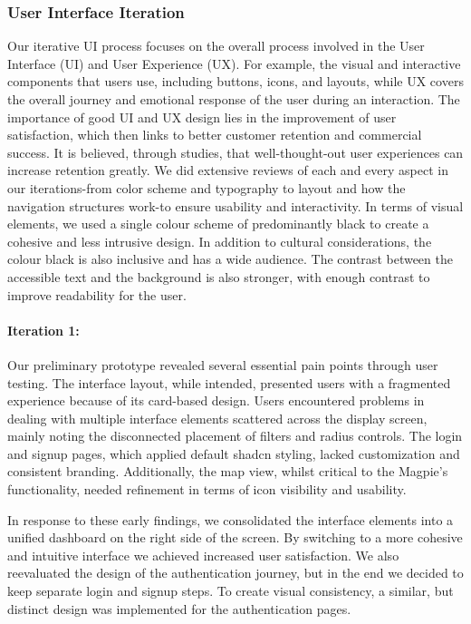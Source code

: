 \subsubsection{User Interface Iteration}
Our iterative UI process focuses on the overall process involved in the User
Interface (UI) and User Experience (UX). For example, the visual and interactive
components that users use, including buttons, icons, and layouts, while UX
covers the overall journey and emotional response of the user during an
interaction. The importance of good UI and UX design lies in the improvement of
user satisfaction, which then links to better customer retention and commercial
success. It is believed, through studies, that well-thought-out user experiences
can increase retention greatly.\cite{psycray2023} We did extensive reviews of
each and every aspect in our iterations-from color scheme and typography to
layout and how the navigation structures work-to ensure usability and
interactivity. In terms of visual elements, we used a single colour scheme of
predominantly black to create a cohesive and less intrusive design. In addition
to cultural considerations, the colour black is also inclusive and has a wide
audience. The contrast between the accessible text and the background is also
stronger, with enough contrast to improve readability for the user.

\paragraph{Iteration 1:}

Our preliminary prototype revealed several essential pain points through
user testing. The interface layout, while intended, presented users
with a fragmented experience because of its card-based design.
Users encountered problems in dealing with multiple interface elements scattered
across the display screen, mainly noting the disconnected placement of filters
and radius controls. The login and signup pages, which applied default shadcn
styling, lacked customization and consistent branding. Additionally, the map
view, whilst critical to the Magpie's functionality, needed refinement in
terms of icon visibility and usability.

In response to these early findings, we consolidated the interface elements into
a unified dashboard on the right side of the screen. By switching to a more cohesive 
and intuitive interface we achieved increased user satisfaction. We also reevaluated
the design of the authentication journey, but in the end we decided to keep separate 
login and signup steps. To create visual consistency, a similar, but distinct design 
was implemented for the authentication pages.

